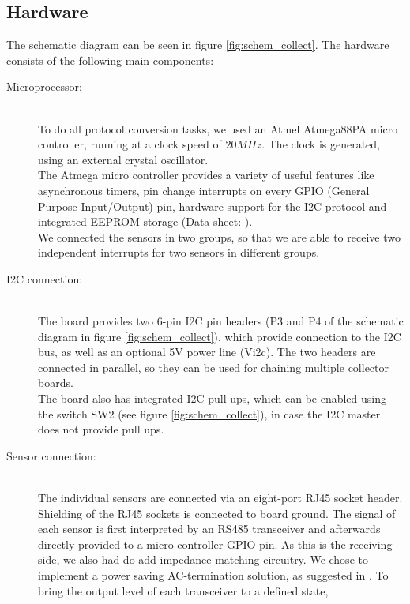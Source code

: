 \documentclass[a4paper]{scrreprt}
\begin{document}
\subsection{Hardware}
The schematic diagram can be seen in figure \ref{fig:schem_collect}. The hardware consists of the following main components:
\begin{description}
  \item[Microprocessor:]\hspace{1cm}\\
    To do all protocol conversion tasks, we used an Atmel Atmega88PA
    micro controller, running at a clock speed of $20MHz$. The clock
    is generated, using an external crystal oscillator.\\
    The Atmega micro controller provides a variety of useful features
    like asynchronous timers, pin change interrupts on every GPIO (General Purpose Input/Output)
    pin, hardware support for the I2C protocol and integrated EEPROM
    storage (Data sheet: \cite{atmega88}).\\
    We connected the sensors in two groups, so that we are able to
    receive two independent interrupts for two sensors in different
    groups.
  \item[I2C connection:]\hspace{1cm}\\
    The board provides two 6-pin I2C pin headers (P3 and P4 of the schematic diagram in figure \ref{fig:schem_collect}), which
    provide connection to the I2C bus, as well as an optional 5V
    power line (Vi2c). The two headers are connected in parallel,
    so they can be used for chaining multiple collector boards.\\
    The board also has integrated I2C pull ups, which can be enabled
    using the switch SW2 (see figure \ref{fig:schem_collect}), in case the I2C master does not provide
    pull ups.
  \item[Sensor connection:]\hspace{1cm}\\
    The individual sensors are connected via an eight-port RJ45
    socket header. Shielding of the RJ45 sockets is connected to
    board ground. The signal of each sensor is first interpreted
    by an RS485 transceiver and afterwards directly provided to a
    micro controller GPIO pin. As this is the receiving side, we also
    had do add impedance matching circuitry. We chose to implement
    a power saving AC-termination solution, as suggested in \cite{st485appnote, rs485}.
    To bring the output level of each transceiver to a defined state,

\end{description}
\end{document}
